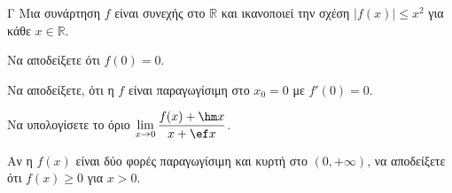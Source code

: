 \begin{thema}{Γ}
Μια συνάρτηση $f$ είναι συνεχής στο $\mathbb{R}$ και ικανοποιεί την σχέση $|f(x)| \le x^2$ για κάθε $x \in \mathbb{R}$.
\begin{erwthma}
  \item Nα αποδείξετε ότι $f(0) = 0$.
  \item Να αποδείξετε, ότι η $f$ είναι παραγωγίσιμη στο $x_0=0$ με $f'(0) = 0$.
  \item Να υπολογίσετε το όριο $\lim\limits_{x \to 0} \dfrac{f(x) + \hm x}{x + \ef x}$.
  \item Αν η $f(x)$ είναι δύο φορές παραγωγίσιμη και κυρτή στο $(0, +\infty)$, να αποδείξετε ότι $f(x) \ge 0$ για $x > 0$.
\end{erwthma}
\end{thema}
